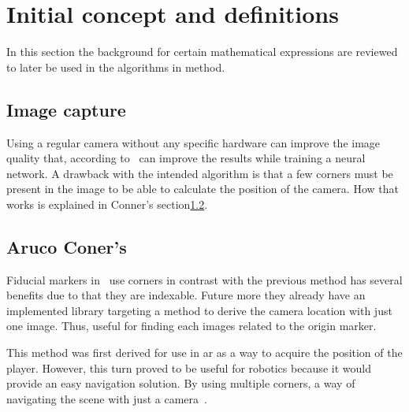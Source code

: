 \section{Initial concept and definitions}\label{sec:background}


In this section the background for certain mathematical expressions are reviewed to later be used in the algorithms in method.



\subsection{Image capture}%
\label{sub:Image_capture}
Using a regular camera without any specific hardware can improve the image quality that, according to~\cite{jeelani2018image} can improve the results while training a neural network.
A drawback with the intended algorithm is that a few \aruco{} corners must be present in the image to be able to calculate the position of the camera.
How that works is explained in \aruco{} Conner's section\ref{sub:ArucoConers}.


\subsection{Aruco Coner's}%
\label{sub:ArucoConers}
Fiducial markers in~\cite{romero2018speeded} use \aruco corners in contrast with the previous method has several benefits due to that they are indexable.
Future more they already have an implemented library targeting a method to derive the camera location with just one image.
Thus, useful for finding each images related to the origin \aruco marker.

This method was first derived for use in \ac{ar} as a way to acquire the position of the player.
However, this turn proved to be useful for robotics because it would provide an easy navigation solution.
By using multiple \aruco corners, a way of navigating the scene with just a camera~\cite{zheng2018vlocaruco}.

